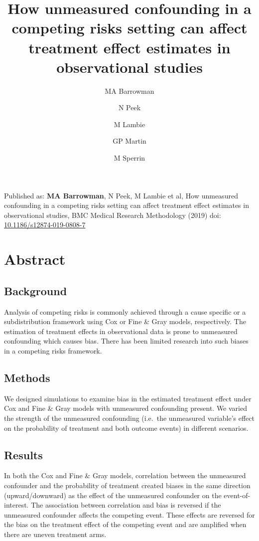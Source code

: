 \documentclass[
]{article}
\title{How unmeasured confounding in a competing risks setting can affect treatment effect estimates in observational studies}
\author{MA Barrowman \and N Peek \and M Lambie \and GP Martin \and M Sperrin}
\date{}
\begin{document}
\maketitle

{
\setcounter{tocdepth}{2}
\tableofcontents
}
Published as: \textbf{MA Barrowman}, N Peek, M Lambie et al, How unmeasured confounding in a competing risks setting can affect treatment effect estimates in observational studies, BMC Medical Research Methodology (2019) doi: \href{https://doi.org/10.1186/s12874-019-0808-7}{10.1186/s12874-019-0808-7}

\hypertarget{abstract}{%
\section*{Abstract}\label{abstract}}

\hypertarget{background}{%
\subsection{Background}\label{background}}

Analysis of competing risks is commonly achieved through a cause specific or a subdistribution framework using Cox or Fine \& Gray models, respectively. The estimation of treatment effects in observational data is prone to unmeasured confounding which causes bias. There has been limited research into such biases in a competing risks framework.

\hypertarget{methods}{%
\subsection{Methods}\label{methods}}

We designed simulations to examine bias in the estimated treatment effect under Cox and Fine \& Gray models with unmeasured confounding present. We varied the strength of the unmeasured confounding (i.e.~the unmeasured variable's effect on the probability of treatment and both outcome events) in different scenarios.

\hypertarget{results}{%
\subsection{Results}\label{results}}

In both the Cox and Fine \& Gray models, correlation between the unmeasured confounder and the probability of treatment created biases in the same direction (upward/downward) as the effect of the unmeasured confounder on the event-of-interest. The association between correlation and bias is reversed if the unmeasured confounder affects the competing event. These effects are reversed for the bias on the treatment effect of the competing event and are amplified when there are uneven treatment arms.
\end{document}
